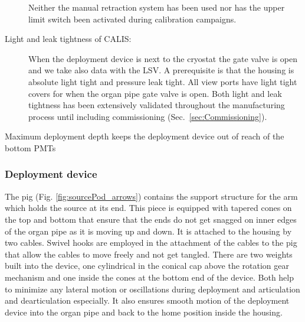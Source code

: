 \begin{description}
Neither the manual retraction system has been used nor has the upper limit switch been activated during calibration campaigns.


     
\item[Light and leak tightness of CALIS:]
When the deployment device is next to the cryostat the gate valve is open and we take also data with the LSV. A prerequisite is that the housing is absolute light tight and pressure leak tight. All view ports have light tight covers for when the organ pipe gate valve is open. Both light and leak tightness has been extensively validated throughout the manufacturing process until including commissioning (Sec.~\ref{sec:Commissioning}).

\item[Maximum deployment depth keeps the deployment device out of reach of the bottom PMTs]

\end{description}
	

\subsubsection{Deployment device}
The pig (Fig. \ref{fig:sourcePod_arrows}) contains the support structure for the arm which holds the source at its end.  This piece is equipped with tapered cones on the top and bottom that ensure that the ends do not get snagged on inner edges of the organ pipe as it is moving up and down. It is attached to the housing by two cables.  Swivel hooks are employed in the attachment of the cables to the pig that allow the cables to move freely and not get tangled. 
There are two weights built into the device, one cylindrical in the conical cap above the rotation gear mechanism and one inside the cones at the bottom end of the device. Both help to minimize any lateral motion or oscillations during deployment and articulation and dearticulation especially. It also ensures smooth motion of the deployment device into the organ pipe and back to the home position inside the housing.

